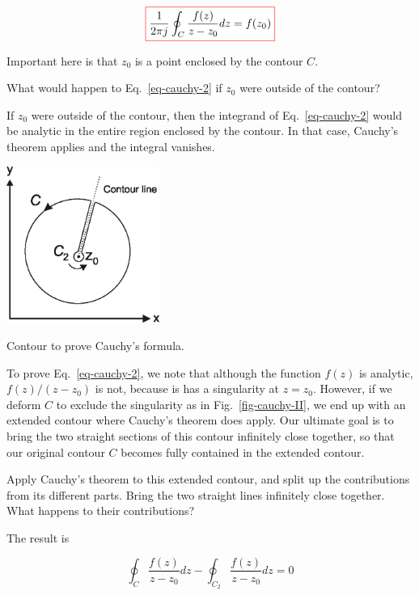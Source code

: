 \begin{equation}
\fbox{$\displaystyle
\frac{1}{2 \pi j}\oint_{{C}} \frac{f(z)} {z-z_0} dz = f(z_0)
\label{eq-cauchy-2}
$}
\end{equation}

Important here is that $z_0$ is a point enclosed by the contour ${C}$.

\begin{cue}
What would happen to Eq.~\ref{eq-cauchy-2} if  $z_0$ were outside of the contour?  
\end{cue}

If $z_0$ were outside of the contour, then the integrand of Eq.~\ref{eq-cauchy-2} would be analytic in the entire region enclosed by the contour. In that case, Cauchy's theorem applies and the integral vanishes.

\begin{marginfigure}[-1cm]
\centering
\includegraphics[width=5cm]{complex/figures/cauchy_II}
\caption{Contour to prove Cauchy's formula.}
\label{fig-cauchy-II}
\end{marginfigure}

To prove Eq.~\ref{eq-cauchy-2}, we note that although the function $f(z)$ is analytic, $f(z)/(z-z_0)$ is not, because is has a singularity at $z=z_0$. However, if we deform ${C}$ to exclude the singularity as in Fig.~\ref{fig-cauchy-II}, we end up with an extended contour where Cauchy's theorem does apply. Our ultimate goal is to bring the two straight sections of this contour infinitely close together, so that our original contour $C$ becomes fully contained in the extended contour.

\begin{cue}
Apply Cauchy's theorem to this extended contour, and split up the contributions from its different parts. Bring the two straight lines infinitely close together. What happens to their contributions?
\end{cue}

The result is

\begin{equation}
\oint_{{C}} \frac{f(z)} {z-z_0} dz -\oint_{{C}_2} \frac{f(z)}
{z-z_0} dz=0
\end{equation} 

